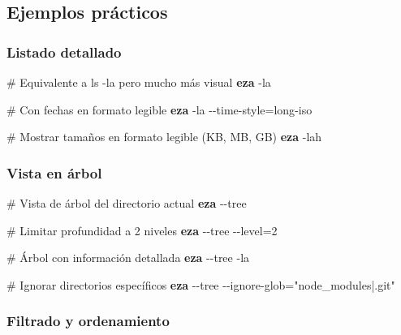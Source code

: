\documentclass[
  11pt,
  letterpaper,
  oneside,
  openany]{scrbook}
\newenvironment{Shaded}{}{}
\newcommand{\AttributeTok}[1]{\textcolor[rgb]{0.84,0.23,0.29}{#1}}
\newcommand{\CommentTok}[1]{\textcolor[rgb]{0.42,0.45,0.49}{#1}}
\newcommand{\ExtensionTok}[1]{\textcolor[rgb]{0.84,0.23,0.29}{\textbf{#1}}}
\newcommand{\NormalTok}[1]{\textcolor[rgb]{0.14,0.16,0.18}{#1}}
\newcommand{\OperatorTok}[1]{\textcolor[rgb]{0.14,0.16,0.18}{#1}}
\newcommand{\StringTok}[1]{\textcolor[rgb]{0.01,0.18,0.38}{#1}}
\begin{document}
\subsection{Ejemplos prácticos}\label{ejemplos-pruxe1cticos}

\subsubsection{Listado detallado}\label{listado-detallado}

\begin{Shaded}
\begin{Highlighting}[]
\CommentTok{\# Equivalente a \textquotesingle{}ls {-}la\textquotesingle{} pero mucho más visual}
\ExtensionTok{eza} \AttributeTok{{-}la}

\CommentTok{\# Con fechas en formato legible}
\ExtensionTok{eza} \AttributeTok{{-}la} \AttributeTok{{-}{-}time{-}style}\OperatorTok{=}\NormalTok{long{-}iso}

\CommentTok{\# Mostrar tamaños en formato legible (KB, MB, GB)}
\ExtensionTok{eza} \AttributeTok{{-}lah}
\end{Highlighting}
\end{Shaded}

\subsubsection{Vista en árbol}\label{vista-en-uxe1rbol}

\begin{Shaded}
\begin{Highlighting}[]
\CommentTok{\# Vista de árbol del directorio actual}
\ExtensionTok{eza} \AttributeTok{{-}{-}tree}

\CommentTok{\# Limitar profundidad a 2 niveles}
\ExtensionTok{eza} \AttributeTok{{-}{-}tree} \AttributeTok{{-}{-}level}\OperatorTok{=}\NormalTok{2}

\CommentTok{\# Árbol con información detallada}
\ExtensionTok{eza} \AttributeTok{{-}{-}tree} \AttributeTok{{-}la}

\CommentTok{\# Ignorar directorios específicos}
\ExtensionTok{eza} \AttributeTok{{-}{-}tree} \AttributeTok{{-}{-}ignore{-}glob}\OperatorTok{=}\StringTok{"node\_modules|.git"}
\end{Highlighting}
\end{Shaded}

\subsubsection{Filtrado y ordenamiento}\label{filtrado-y-ordenamiento}
\end{document}
